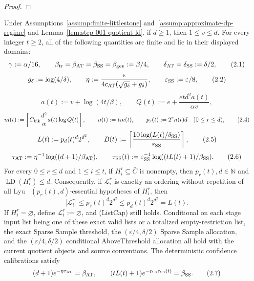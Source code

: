 \begin{proof}
\end{proof}

\begin{lemma}\label{lem:step-001-calibration}
Under Assumptions~\ref{assump:finite-littlestone}
and~\ref{assump:approximate-dp-regime} and
Lemma~\ref{lem:step-001-quotient-ld}, if \(d\ge1\), then
\(1\le v\le d\). For every integer \(t\ge2\), all of the following
quantities are finite and lie in their displayed domains:
\[
\gamma:=\alpha/16,
\qquad
\beta_{\rm tr}=\beta_{\rm AT}=\beta_{\rm SS}=\beta_{\rm gen}:=\beta/4,
\qquad
\delta_{\rm AT}=\delta_{\rm SS}:=\delta/2,
\tag{2.1}
\]
\[
g_\delta:=\log(4/\delta),
\qquad
\eta:=\frac{\varepsilon}
{4c_{\rm AT}(\sqrt{g_\delta}+g_\delta)},
\qquad
\varepsilon_{\rm SS}:=\varepsilon/8,
\tag{2.2}
\]
\[
a(t):=v+\log(4t/\beta),
\qquad
Q(t):=e+\frac{etd^2a(t)}{\alpha v},
\tag{2.3}
\]
\[
m(t):=\left\lceil
C_{\rm blk}\frac{d^2}{\alpha}a(t)\log Q(t)
\right\rceil,
\qquad n(t):=tm(t),
\qquad p_r(t):=2^rn(t)d\quad(0\le r\le d),
\tag{2.4}
\]
\[
L(t):=p_d(t)^d2^{d^2},
\qquad
B(t):=\left\lceil
\frac{10\log(L(t)/\delta_{\rm SS})}{\varepsilon_{\rm SS}}
\right\rceil,
\tag{2.5}
\]
\[
\tau_{\rm AT}:=\eta^{-1}
\log((d+1)/\beta_{\rm AT}),
\qquad
\tau_{\rm SS}(t):=\varepsilon_{\rm SS}^{-1}
\log((tL(t)+1)/\beta_{\rm SS}).
\tag{2.6}
\]
For every \(0\le r\le d\) and \(1\le i\le t\), if
\(H_i^r\subseteq\bar C\) is nonempty, then
\(p_r(t),d\in\mathbb N\) and
\(\operatorname{LD}(H_i^r)\le d\). Consequently, if
\(\mathcal L_i^r\) is exactly an ordering without repetition of all Lyu~\citep{lyu2025}
\((p_r(t),d)\)-essential hypotheses of \(H_i^r\), then
\[
|\mathcal L_i^r|
\le p_r(t)^d2^{d^2}
\le p_d(t)^d2^{d^2}
=L(t).
\tag{ListCap}
\]
If \(H_i^r=\varnothing\), define \(\mathcal L_i^r:=\varnothing\), and
(ListCap) still holds. Conditional on each stage input list being one of
these exact valid lists or a totalized empty-restriction list, the
exact Sparse Sample threshold, the
\((\varepsilon/4,\delta/2)\) Sparse Sample allocation, and the
\((\varepsilon/4,\delta/2)\) conditional AboveThreshold allocation all hold
with the current quotient objects and source conventions. The deterministic
confidence calibrations satisfy
\[
(d+1)e^{-\eta\tau_{\rm AT}}=\beta_{\rm AT},
\qquad
(tL(t)+1)e^{-\varepsilon_{\rm SS}\tau_{\rm SS}(t)}=\beta_{\rm SS}.
\tag{2.7}
\]


\end{lemma}

